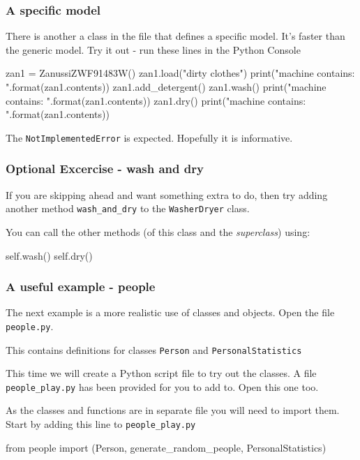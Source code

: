 \documentclass{beamer}
\begin{document}
\begin{frame}[fragile]
\frametitle{A specific model}

There is another a class in the file that defines a specific model.
It's faster than the generic model. 
Try it out - run these lines in the Python Console

\begin{code} 
zan1 = ZanussiZWF91483W()
zan1.load("dirty clothes")
print("machine contains: {}".format(zan1.contents))
zan1.add_detergent()
zan1.wash()
print("machine contains: {}".format(zan1.contents))
zan1.dry()
print("machine contains: {}".format(zan1.contents))
\end{code}
The \texttt{NotImplementedError} is expected. Hopefully it is informative.

\end{frame}

\begin{frame}[fragile]
\frametitle{Optional Excercise - wash and dry}

If you are skipping ahead and want something extra to do,
then try adding another method \texttt{wash\_and\_dry} to
the \texttt{WasherDryer} class.

You can call the other methods (of this class and the \emph{superclass})
using:

\begin{code} 
        self.wash()
        self.dry()
\end{code}

\end{frame}

\begin{frame}[fragile]
\frametitle{A useful example - people}

The next example is a more realistic use of classes and objects.
Open the file \texttt{people.py}. 

This contains definitions for classes \texttt{Person} and \texttt{PersonalStatistics}

This time we will create a Python script file to try out the classes. 
A file \texttt{people\_play.py} has been provided for you to add to. Open this one too.

As the classes and functions are in separate file you will need to import them. 
Start by adding this line to \texttt{people\_play.py}

\begin{code} 
from people import (Person, generate_random_people, 
                    PersonalStatistics)
\end{code}

\end{frame}
\end{document}
